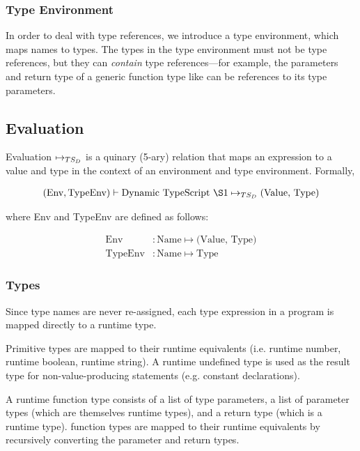 \subsubsection*{Type Environment}

In order to deal with type references, we introduce a type environment, which maps names to types. 
The types in the type environment must not be type references, but they can \textit{contain} type references---for example, the parameters and return type of a generic function type like  can be references to its type parameters.


\subsection{Evaluation}
\label{eval}

Evaluation $\mapsto_{TS_D}$ is a quinary (5-ary) relation that maps an expression to a value and type in the  context of an environment and type environment.
Formally, 

\begin{align*}
    (\textrm{Env}, \textrm{TypeEnv}) \vdash \textrm{\DynamicTS{}} \Eval \textrm{(Value, Type)}
\end{align*}

where Env and TypeEnv are defined as follows:

\begin{align*}
\textrm{Env} &: \textrm{Name} \mapsto \textrm{(Value, Type)} \\
\textrm{TypeEnv} &: \textrm{Name} \mapsto \textrm{Type}
\end{align*}

\subsubsection*{Types}

Since type names are never re-assigned, each type expression in a \DynamicTS{} program is mapped directly to a runtime type.

Primitive types are mapped to their runtime equivalents (i.e. runtime number, runtime boolean, runtime string). 
A runtime undefined type is used as the result type for non-value-producing statements (e.g. constant declarations).

A runtime function type consists of a list of type parameters, a list of parameter types (which are themselves runtime types), and a return type (which is a runtime type).
\DynamicTS{} function types are mapped to their runtime equivalents by recursively converting the parameter and return types. 

